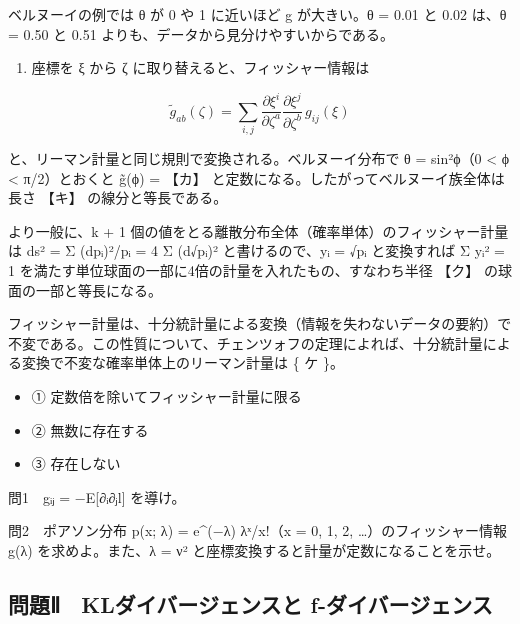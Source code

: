 \documentclass[
  10pt,
  a4paper,
]{article}
\providecommand{\tightlist}{%
  \setlength{\itemsep}{0pt}\setlength{\parskip}{0pt}}
\begin{document}
ベルヌーイの例では θ が 0 や 1 に近いほど g が大きい。θ = 0.01 と 0.02
は、θ = 0.50 と 0.51 よりも、データから見分けやすいからである。

\begin{enumerate}
\def\labelenumi{(\arabic{enumi})}
\setcounter{enumi}{2}
\tightlist
\item
  座標を ξ から ζ に取り替えると、フィッシャー情報は
\end{enumerate}

\[\tilde g_{ab}(\zeta) = \sum_{i,j} \frac{\partial \xi^i}{\partial \zeta^a} \frac{\partial \xi^j}{\partial \zeta^b}\, g_{ij}(\xi)\]

と、リーマン計量と同じ規則で変換される。ベルヌーイ分布で θ =
sin²{\fallbackfont ϕ}（0 \textless{} {\fallbackfont ϕ} \textless{}
π/2）とおくと {\fallbackfont g̃}({\fallbackfont ϕ}) = 【カ】
と定数になる。したがってベルヌーイ族全体は長さ 【キ】
の線分と等長である。

より一般に、k + 1
個の値をとる離散分布全体（確率単体）のフィッシャー計量は ds² = Σ
(dp{\fallbackfont ᵢ})²/p{\fallbackfont ᵢ} = 4 Σ (d√p{\fallbackfont ᵢ})²
と書けるので、y{\fallbackfont ᵢ} = √p{\fallbackfont ᵢ} と変換すれば Σ
y{\fallbackfont ᵢ}² = 1
を満たす単位球面の一部に4倍の計量を入れたもの、すなわち半径 【ク】
の球面の一部と等長になる。

フィッシャー計量は、十分統計量による変換（情報を失わないデータの要約）で不変である。この性質について、チェンツォフの定理によれば、十分統計量による変換で不変な確率単体上のリーマン計量は
\{ ケ \}。

\begin{itemize}
\tightlist
\item
  ① 定数倍を除いてフィッシャー計量に限る
\item
  ② 無数に存在する
\item
  ③ 存在しない
\end{itemize}

問1　g{\fallbackfont ᵢⱼ} = −E{[}∂{\fallbackfont ᵢ}∂{\fallbackfont ⱼ}l{]}
を導け。

問2　ポアソン分布 p(x; λ) = e\^{}(−λ) λ{\fallbackfont ˣ}/x!（x = 0, 1,
2, \ldots）のフィッシャー情報 g(λ) を求めよ。また、λ = ν²
と座標変換すると計量が定数になることを示せ。

\hypertarget{ux554fux984cux2171-klux30c0ux30a4ux30d0ux30fcux30b8ux30a7ux30f3ux30b9ux3068-f-ux30c0ux30a4ux30d0ux30fcux30b8ux30a7ux30f3ux30b9}{%
\subsection{問題Ⅱ　KLダイバージェンスと
f-ダイバージェンス}\label{ux554fux984cux2171-klux30c0ux30a4ux30d0ux30fcux30b8ux30a7ux30f3ux30b9ux3068-f-ux30c0ux30a4ux30d0ux30fcux30b8ux30a7ux30f3ux30b9}}
\end{document}
